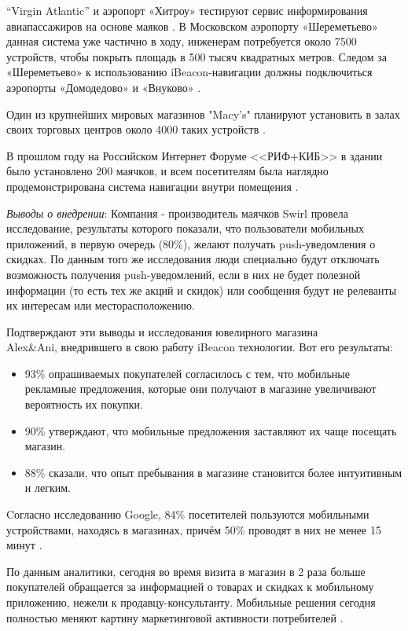 “Virgin Atlantic” и аэропорт «Хитроу» тестируют сервис информирования авиапассажиров на основе маяков \cite{web:Heathrow}. В Московском аэропорту «Шереметьево» данная система уже частично в ходу, инженерам потребуется около 7500 устройств, чтобы покрыть площадь в 500 тысяч квадратных метров. Следом за «Шереметьево» к использованию iBeacon-навигации должны подключиться аэропорты «Домодедово» и «Внуково» \cite{web:Aeroports}.

Один из крупнейших мировых магазинов "Macy's"  планируют установить в залах своих торговых центров около 4000 таких устройств \cite{web:Macy}. 

В прошлом году на Российском Интернет Форуме <<РИФ+КИБ>> в здании было установлено 200 маячков, и всем посетителям была наглядно продемонстрирована система навигации внутри помещения \cite{web:RifKib}.

\textit{Выводы о внедрении}: 
Компания - производитель маячков Swirl провела исследование, результаты которого показали, что пользователи мобильных приложений, в первую очередь (80\%), желают получать push-уведомления о скидках. По данным того же исследования люди специально будут отключать возможность получения push-уведомлений, если в них не будет полезной информации (то есть тех же акций и скидок) или сообщения будут не релеванты их интересам или месторасположению.

Подтверждают эти выводы и исследования ювелирного магазина \\Alex\&Ani, внедрившего в свою работу iBeacon технологии. Вот его результаты:
\begin{itemize}
    \item
    93\% опрашиваемых покупателей согласилось с тем, что мобильные рекламные предложения, которые они получают в магазине увеличивают вероятность их покупки.
    \item
    90\% утверждают, что мобильные предложения заставляют их чаще посещать магазин.
    \item
    88\% сказали, что опыт пребывания в магазине становится более интуитивным и легким.
\end{itemize}

Cогласно исследованию Google, 84\% посетителей пользуются мобильными устройствами, находясь в магазинах, причём 50\% проводят в них не менее 15 минут \cite{web:GoogleShopExpirience}.

По данным аналитики, сегодня во время визита в магазин в 2 раза больше покупателей обращается за информацией о товарах и скидках к мобильному приложению, нежели к продавцу-консультанту. Мобильные решения сегодня полностью меняют картину маркетинговой активности потребителей \cite{web:CasesZero}.